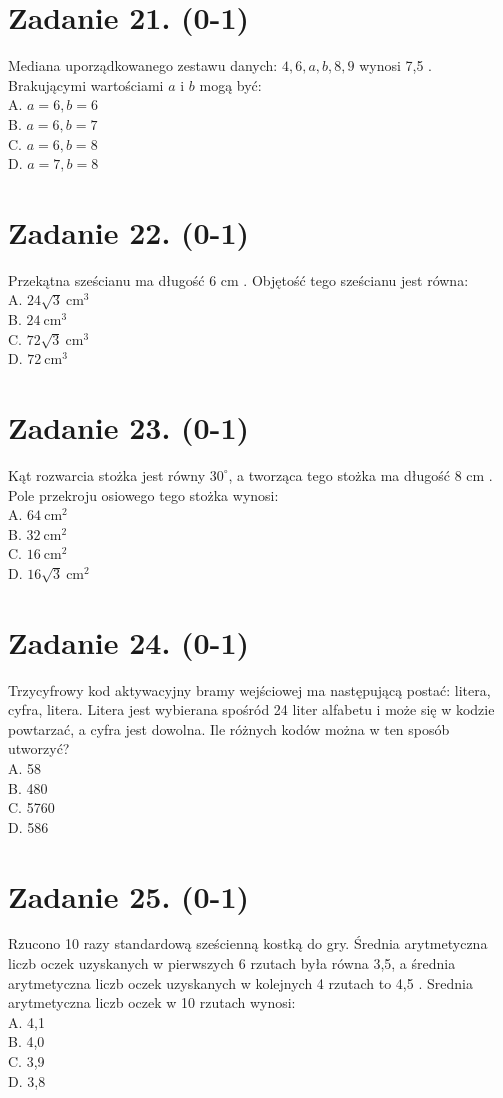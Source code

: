 \documentclass[10pt]{article}
\begin{document}
\section*{Zadanie 21. (0-1)}
Mediana uporządkowanego zestawu danych: \(4,6, a, b, 8,9\) wynosi 7,5 . Brakującymi wartościami \(a\) i \(b\) mogą być:\\
A. \(a=6, b=6\)\\
B. \(a=6, b=7\)\\
C. \(a=6, b=8\)\\
D. \(a=7, b=8\)

\section*{Zadanie 22. (0-1)}
Przekątna sześcianu ma długość 6 cm . Objętość tego sześcianu jest równa:\\
A. \(24 \sqrt{3} \mathrm{~cm}^{3}\)\\
B. \(24 \mathrm{~cm}^{3}\)\\
C. \(72 \sqrt{3} \mathrm{~cm}^{3}\)\\
D. \(72 \mathrm{~cm}^{3}\)

\section*{Zadanie 23. (0-1)}
Kąt rozwarcia stożka jest równy \(30^{\circ}\), a tworząca tego stożka ma długość 8 cm . Pole przekroju osiowego tego stożka wynosi:\\
A. \(64 \mathrm{~cm}^{2}\)\\
B. \(32 \mathrm{~cm}^{2}\)\\
C. \(16 \mathrm{~cm}^{2}\)\\
D. \(16 \sqrt{3} \mathrm{~cm}^{2}\)

\section*{Zadanie 24. (0-1)}
Trzycyfrowy kod aktywacyjny bramy wejściowej ma następującą postać: litera, cyfra, litera. Litera jest wybierana spośród 24 liter alfabetu i może się w kodzie powtarzać, a cyfra jest dowolna. Ile różnych kodów można w ten sposób utworzyć?\\
A. 58\\
B. 480\\
C. 5760\\
D. 586

\section*{Zadanie 25. (0-1)}
Rzucono 10 razy standardową sześcienną kostką do gry. Średnia arytmetyczna liczb oczek uzyskanych w pierwszych 6 rzutach była równa 3,5, a średnia arytmetyczna liczb oczek uzyskanych w kolejnych 4 rzutach to 4,5 . Srednia arytmetyczna liczb oczek w 10 rzutach wynosi:\\
A. 4,1\\
B. 4,0\\
C. 3,9\\
D. 3,8
\end{document}
